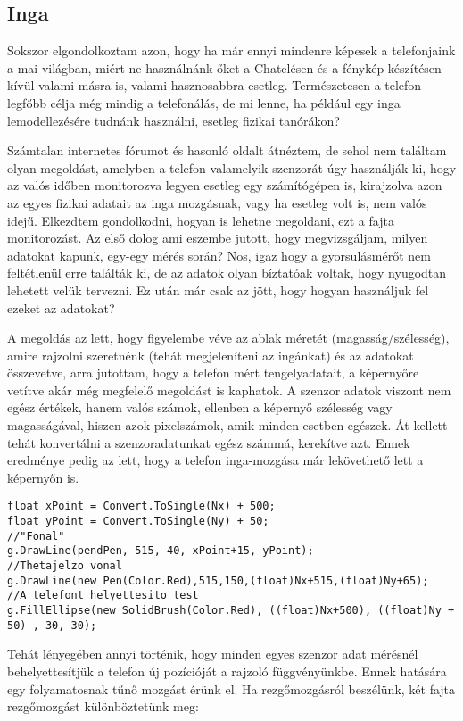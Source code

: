 \documentclass{thesis-ekf}
\theoremstyle{definition}
\theoremstyle{remark}
\begin{document}
\subsection{Inga}
Sokszor elgondolkoztam azon, hogy ha már ennyi mindenre képesek a telefonjaink a mai világban, miért ne használnánk őket a Chatelésen és a fénykép készítésen kívül valami másra is, valami hasznosabbra esetleg. Természetesen a telefon legfőbb célja még mindig a telefonálás, de mi lenne, ha például egy inga lemodellezésére tudnánk használni, esetleg fizikai tanórákon?
\par Számtalan internetes fórumot és hasonló oldalt átnéztem, de sehol nem találtam olyan megoldást, amelyben a telefon valamelyik szenzorát úgy használják ki, hogy az valós időben monitorozva legyen esetleg egy számítógépen is, kirajzolva azon az egyes fizikai adatait az inga mozgásnak, vagy ha esetleg volt is, nem valós idejű. Elkezdtem gondolkodni, hogyan is lehetne megoldani, ezt a fajta monitorozást. Az első dolog ami eszembe jutott, hogy megvizsgáljam, milyen adatokat kapunk, egy-egy mérés során? Nos, igaz hogy a gyorsulásmérőt nem feltétlenül erre találták ki, de az adatok olyan bíztatóak voltak, hogy nyugodtan lehetett velük tervezni. Ez után már csak az jött, hogy hogyan használjuk fel ezeket az adatokat?
\par A megoldás az lett, hogy figyelembe véve az ablak méretét (magasság/szélesség), amire rajzolni szeretnénk (tehát megjeleníteni az ingánkat) és az adatokat összevetve, arra jutottam, hogy a telefon mért tengelyadatait, a képernyőre vetítve akár még megfelelő megoldást is kaphatok. A szenzor adatok viszont nem egész értékek, hanem valós számok, ellenben a képernyő szélesség vagy magasságával, hiszen azok pixelszámok, amik minden esetben egészek. Át kellett tehát konvertálni a szenzoradatunkat egész számmá, kerekítve azt. Ennek eredménye pedig az lett, hogy a telefon inga-mozgása már lekövethető lett a képernyőn is. 
 \begin{lstlisting}
float xPoint = Convert.ToSingle(Nx) + 500;
float yPoint = Convert.ToSingle(Ny) + 50;
//"Fonal"
g.DrawLine(pendPen, 515, 40, xPoint+15, yPoint);
//Thetajelzo vonal
g.DrawLine(new Pen(Color.Red),515,150,(float)Nx+515,(float)Ny+65);
//A telefont helyettesito test
g.FillEllipse(new SolidBrush(Color.Red), ((float)Nx+500), ((float)Ny + 50) , 30, 30);
 \end{lstlisting}
 \par Tehát lényegében annyi történik, hogy minden egyes szenzor adat mérésnél behelyettesítjük a telefon új pozícióját a rajzoló függvényünkbe. Ennek hatására egy folyamatosnak tűnő mozgást érünk el. Ha rezgőmozgásról beszélünk, két fajta rezgőmozgást különböztetünk meg:
\end{document}
